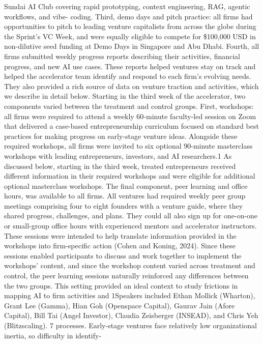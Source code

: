 Sundai AI Club covering rapid prototyping, context engineering, RAG, agentic workflows, and vibe-
coding. Third, demo days and pitch practice: all firms had opportunities to pitch to leading venture
capitalists from across the globe during the Sprint’s VC Week, and were equally eligible to compete
for \$100,000 USD in non-dilutive seed funding at Demo Days in Singapore and Abu Dhabi. Fourth,
all firms submitted weekly progress reports describing their activities, financial progress, and new
AI use cases. These reports helped ventures stay on track and helped the accelerator team identify
and respond to each firm’s evolving needs. They also provided a rich source of data on venture
traction and activities, which we describe in detail below.
Starting in the third week of the accelerator, two components varied between the treatment and
control groups. First, workshops: all firms were required to attend a weekly 60-minute faculty-led
session on Zoom that delivered a case-based entrepreneurship curriculum focused on standard best
practices for making progress on early-stage venture ideas. Alongside these required workshops,
all firms were invited to six optional 90-minute masterclass workshops with leading entrepreneurs,
investors, and AI researchers.1 As discussed below, starting in the third week, treated entrepreneurs
received different information in their required workshops and were eligible for additional optional
masterclass workshops.
The final component, peer learning and office hours, was available to all firms. All ventures had
required weekly peer group meetings comprising four to eight founders with a venture guide, where
they shared progress, challenges, and plans. They could all also sign up for one-on-one or small-group
office hours with experienced mentors and accelerator instructors. These sessions were intended to
help translate information provided in the workshops into firm-specific action (Cohen and Koning,
2024). Since these sessions enabled participants to discuss and work together to implement the
workshops’ content, and since the workshop content varied across treatment and control, the peer
learning sessions naturally reinforced any differences between the two groups.
This setting provided an ideal context to study frictions in mapping AI to firm activities and
1Speakers included Ethan Mollick (Wharton), Grant Lee (Gamma), Hian Goh (Openspace Capital), Gaurav Jain
(Afore Capital), Bill Tai (Angel Investor), Claudia Zeisberger (INSEAD), and Chris Yeh (Blitzscaling).
7
processes. Early-stage ventures face relatively low organizational inertia, so difficulty in identify-
